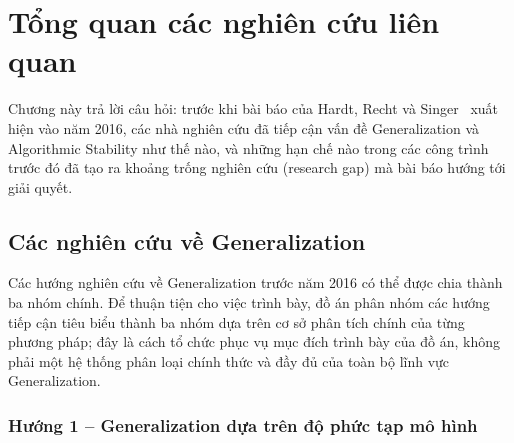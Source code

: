 \chapter{Tổng quan các nghiên cứu liên quan}
\label{chap:relatedwork}

Chương này trả lời câu hỏi: trước khi bài báo của Hardt, Recht và Singer~\cite{hardt2016train} xuất hiện vào năm 2016, các nhà nghiên cứu đã tiếp cận vấn đề Generalization và Algorithmic Stability như thế nào, và những hạn chế nào trong các công trình trước đó đã tạo ra khoảng trống nghiên cứu (research gap) mà bài báo hướng tới giải quyết.

\section{Các nghiên cứu về Generalization}
\label{sec:cacnghiencuu-generalization}

Các hướng nghiên cứu về Generalization trước năm 2016 có thể được chia thành ba nhóm chính. Để thuận tiện cho việc trình bày, đồ án phân nhóm các hướng tiếp cận tiêu biểu thành ba nhóm dựa trên cơ sở phân tích chính của từng phương pháp; đây là cách tổ chức phục vụ mục đích trình bày của đồ án, không phải một hệ thống phân loại chính thức và đầy đủ của toàn bộ lĩnh vực Generalization.

\subsection{Hướng 1 -- Generalization dựa trên độ phức tạp mô hình}

